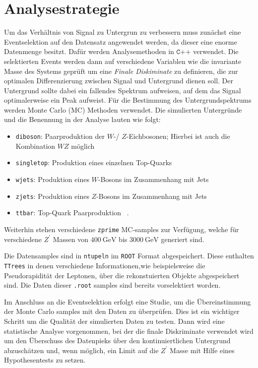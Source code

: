 \section{Analysestrategie}
Um das Verhältnis von Signal zu Untergrun zu verbessern muss zunächst eine Eventselektion auf den Datensatz angewendet werden, da dieser eine enorme 
Datenmenge besitzt. Dafür werden Analysemethoden in $\texttt{C++}$ verwendet. Die selektierten Events werden dann auf verschiedene Variablen wie die 
invariante Masse des Systems geprüft um eine \textit{Finale Diskiminate} zu definieren, die zur optimalen Differenzierung zwischen Signal und 
Untergrund dienen soll. Der Untergrund sollte dabei ein fallendes Spektrum aufweisen, auf dem das Signal optimalerweise ein Peak aufweist. Für die 
Bestimmung des Untergrundspektrums werden Monte Carlo (MC) Methoden verwendet. Die simulierten Untergründe und die Benennung in der Analyse lauten 
wie folgt: 

\begin{itemize}
    \item \texttt{diboson}: Paarproduktion der $W$-/ $Z$-Eichbosonen; Hierbei ist auch die Kombination $WZ$ möglich 
    \item \texttt{singletop}: Produktion eines einzelnen Top-Quarks
    \item \texttt{wjets}: Produktion eines $W$-Bosons im Zusammenhang mit Jets
    \item \texttt{zjets}: Produktion eines $Z$-Bosons im Zusammenhang mit Jets
    \item \texttt{ttbar}: Top-Quark Paarproduktion \, .
\end{itemize}

Weiterhin stehen verschiedene \texttt{zprime} MC-samples zur Verfügung, welche für verschiedene $Z^\prime$ Massen von $\SI{400}{\giga\electronvolt}$ bis 
$\SI{3000}{\giga\electronvolt}$ generiert sind. \par
Die Datensamples sind in \texttt{ntupeln} im \texttt{ROOT} Format abgespeichert. Diese enthalten \texttt{TTrees} in denen verschiedene Informationen,wie beispielsweise 
die Pseudorapidität der Leptonen, über 
die rekonstuierten Objekte abgespeichert sind. Die Daten dieser \texttt{.root} samples sind bereits vorselektiert worden. \par 

Im Anschluss an die Eventselektion erfolgt eine Studie, um die Übereinstimmung der Monte Carlo samples mit den Daten zu überprüfen. Dies ist ein wichtiger 
Schritt um die Qualität der simulierten Daten zu testen. Dann wird eine statistische Analyse vorgenommen, bei der die finale Diskriminate verwendet wird 
um den Überschuss des Datenpieks über den kontinuiertlichen Untergrund abzuschätzen und, wenn möglich, ein Limit auf die $Z^\prime$ Masse mit Hilfe eines 
Hypothesentests zu setzen.
